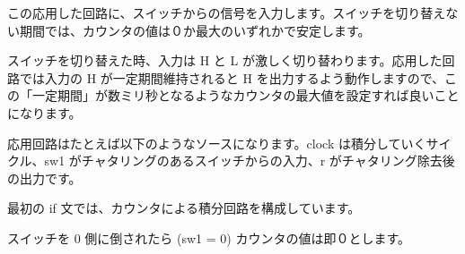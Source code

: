 \documentclass[letterpaper,10pt,dvipdfmx]{sphinxmanual}
\begin{document}
この応用した回路に、スイッチからの信号を入力します。スイッチを切り替えない期間では、カウンタの値は０か最大のいずれかで安定します。

スイッチを切り替えた時、入力は H と L が激しく切り替わります。応用した回路では入力の H が一定期間維持されると H を出力するよう動作しますので、この「一定期間」が数ミリ秒となるようなカウンタの最大値を設定すれば良いことになります。

\begin{figure}[htbp]
\centering

\noindent{}
\end{figure}

応用回路はたとえば以下のようなソースになります。clock は積分していくサイクル、sw1 がチャタリングのあるスイッチからの入力、r がチャタリング除去後の出力です。

\begin{sphinxVerbatim}[commandchars=\\\{\}]
 
        
        
        
            
          
     

        
        
        
     
   
 
\end{sphinxVerbatim}

最初の if 文では、カウンタによる積分回路を構成しています。

スイッチを 0 側に倒されたら (sw1 = \textquotesingle{}0\textquotesingle{}) カウンタの値は即０とします。
\end{document}
